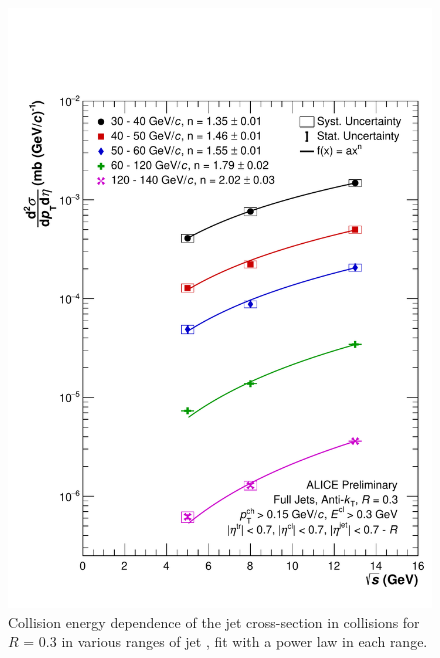 \begin{figure}[h!]
    \centering
    \includegraphics[width=15cm]{figures/EnergyComparisons/sqrtSComp_R03.pdf}
    \caption{Collision energy dependence of the jet cross-section in \pp collisions for $R$ = 0.3 in various ranges of jet \pT, fit with a power law in each \pT range.}
    \label{fig:appSqrtSCompareR03}
\end{figure}

